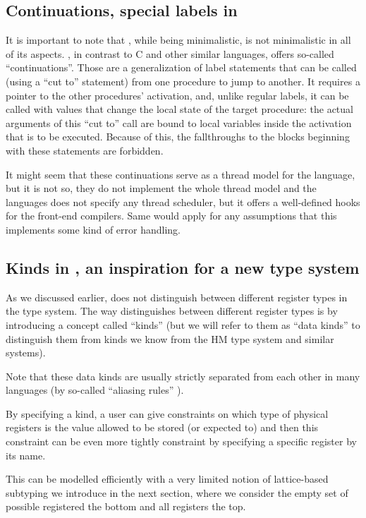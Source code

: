 \subsection{Continuations, special labels in \cmm{}}

It is important to note that \cmm{}, while being minimalistic, is not minimalistic in all of its aspects. \cmm{}, in contrast to C and other similar languages, offers so-called ``continuations''. Those are a generalization of label statements that can be called (using a ``cut to'' statement) from one procedure to jump to another. It requires a pointer to the other procedures' activation, and, unlike regular labels, it can be called with values that change the local state of the target procedure: the actual arguments of this ``cut to'' call are bound to local variables inside the activation that is to be executed. Because of this, the fallthroughs to the blocks beginning with these statements are forbidden.

It might seem that these continuations serve as a thread model for the language, but it is not so, they do not implement the whole thread model and the languages does not specify any thread scheduler, but it offers a well-defined hooks for the front-end compilers. Same would apply for any assumptions that this implements some kind of error handling.

\subsection{Kinds in \cmm{}, an inspiration for a new type system}

As we discussed earlier, \cmm{} does not distinguish between different register types in the type system. The way \cmm{} distinguishes between different register types is by introducing a concept called ``kinds'' (but we will refer to them as ``data kinds'' to distinguish them from kinds we know from the HM type system and similar systems).

Note that these data kinds are usually strictly separated from each other in many languages (by so-called ``aliasing rules'' ).

By specifying a kind, a user can give constraints on which type of physical registers is the value allowed to be stored (or expected to) and then this constraint can be even more tightly constraint by specifying a specific register by its name.

This can be modelled efficiently with a very limited notion of lattice-based subtyping we introduce in the next section, where we consider the empty set of possible registered the bottom and all registers the top.

